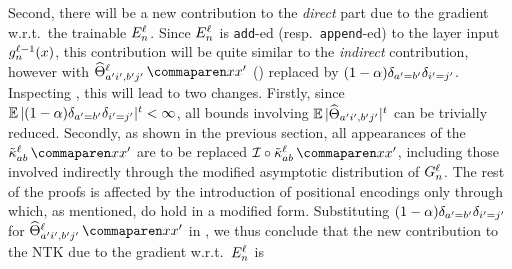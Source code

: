Second, there will be a new contribution to the \emph{direct} part due to the gradient w.r.t.\ the trainable $E_{n}^{\ell}$.
Since $E_{n}^{\ell}$ is \texttt{add}-ed (resp.\ \texttt{append}-ed) to the layer input ${g}^{\ell - 1}_{n}{(x)}$, this contribution will be quite similar to the \emph{indirect} contribution, however with $\ntkhatf{\gIndexA \gIndexZA, \gIndexB \gIndexZB}{\depthSymbol}{\inputSymbol}{\inputSymbol'}$ () replaced by $(1 - \alpha) \delta_{a' = b'} \delta_{i' = j'}$.
Inspecting , this will lead to two changes.
Firstly, since $\operatorname*{\mathbb{E}} |(1 - \alpha) \delta_{a' = b'} \delta_{i' = j'}|^{t} < \infty$, all bounds involving $\operatorname*{\mathbb{E}} | \widehat{\Theta}_{a' i', b' j'}|^t$ can be trivially reduced.
Secondly, as shown in the previous section, 
all appearances of the $\kerntildef{a b}{\depthSymbol}{\inputSymbol}{\inputSymbol'}$ are to be replaced $\interpKern\circ\kerntildef{a b}{\depthSymbol}{\inputSymbol}{\inputSymbol'}$, including those involved indirectly through the modified asymptotic distribution of $G_{n}^{\ell}$.
The rest of the proofs is affected by the introduction of positional encodings only through  which, as mentioned, do hold in a modified form.
Substituting $(1 - \alpha) \delta_{a' = b'} \delta_{i' = j'}$ for $\ntkhatf{\gIndexA \gIndexZA, \gIndexB \gIndexZB}{\depthSymbol}{\inputSymbol}{\inputSymbol'}$ in , we thus conclude that the new contribution to the NTK due to the gradient w.r.t.\ $E_{n}^{\ell}$ is
